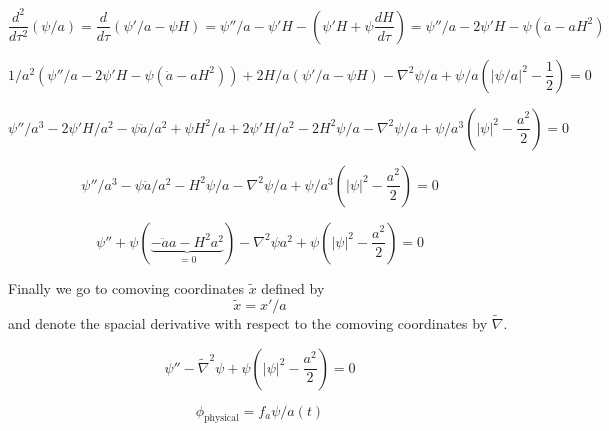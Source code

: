 \documentclass[a4paper]{article}
\begin{document}
\begin{equation}
    \frac{d^2}{d \tau^2} (\psi / a) = \frac{d}{d \tau} (\psi' / a - \psi H)
    = \psi'' / a - \psi' H - (\psi' H + \psi \frac{d H}{d \tau})
    = \psi'' / a - 2 \psi' H - \psi ( \ddot{a} - a H^2 )
\end{equation}

\begin{equation}
    1/a^2 ( \psi'' / a - 2 \psi' H - \psi ( \ddot{a} - a H^2 ) ) + 2 H / a (\psi' / a - \psi H)
    - \nabla^2 \psi / a + \psi / a \left( |\psi / a|^2 - \frac{1}{2} \right) = 0
\end{equation}

\begin{equation}
    \psi'' / a^3 - 2 \psi' H / a^2 - \psi \ddot{a} / a^2 + \psi H^2 / a
    + 2 \psi' H / a^2 - 2 H^2 \psi / a
    - \nabla^2 \psi / a + \psi / a^3 ( |\psi|^2 - \frac{a^2}{2} ) = 0
\end{equation}

\begin{equation}
    \psi'' / a^3 - \psi \ddot{a} / a^2 - H^2 \psi / a
    - \nabla^2 \psi / a + \psi / a^3 ( |\psi|^2 - \frac{a^2}{2} ) = 0
\end{equation}

\begin{equation}
    \psi'' + \psi (\underbrace{- \ddot{a} a - H^2 a^2}_{= 0})
    - \nabla^2 \psi a^2 + \psi ( |\psi|^2 - \frac{a^2}{2} ) = 0
\end{equation}

Finally we go to comoving coordinates $\tilde{x}$ defined by
\begin{equation}
    \tilde{x} = x' / a
\end{equation}
and denote the spacial derivative with respect to the comoving coordinates by $\tilde{\nabla}$.

\begin{equation}
    \psi'' - \tilde{\nabla}^2 \psi + \psi ( |\psi|^2 - \frac{a^2}{2} ) = 0
\end{equation}

\begin{equation}
    \phi_\mathrm{physical} = f_a \psi / a(t)
\end{equation}
\end{document}
